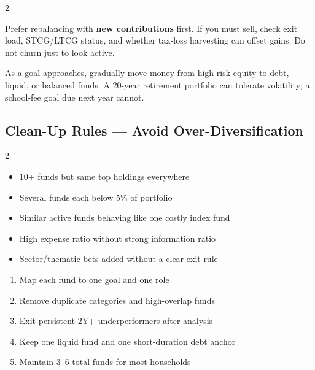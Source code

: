 \documentclass[11pt,a4paper]{article}
\begin{document}
\begin{multicols}{2}
\begin{tipbox}[title=Tax-Aware Rebalancing]
Prefer rebalancing with \textbf{new contributions} first.  If you must sell, check exit load, STCG/LTCG status, and whether tax-loss harvesting can offset gains.  Do not churn just to look active.
\end{tipbox}

\begin{warnbox}[title=Glide Path Near a Goal]
As a goal approaches, gradually move money from high-risk equity to debt, liquid, or balanced funds.  A 20-year retirement portfolio can tolerate volatility; a school-fee goal due next year cannot.
\end{warnbox}
\end{multicols}

\subsection{Clean-Up Rules --- Avoid Over-Diversification}

\begin{multicols}{2}
\begin{warnbox}[title=Symptoms of Too Many Funds]
\begin{itemize}
  \item 10+ funds but same top holdings everywhere
  \item Several funds each below 5\% of portfolio
  \item Similar active funds behaving like one costly index fund
  \item High expense ratio without strong information ratio
  \item Sector/thematic bets added without a clear exit rule
\end{itemize}
\end{warnbox}

\begin{tipbox}[title=Consolidation Method]
\begin{enumerate}
  \item Map each fund to one goal and one role
  \item Remove duplicate categories and high-overlap funds
  \item Exit persistent 2Y+ underperformers after analysis
  \item Keep one liquid fund and one short-duration debt anchor
  \item Maintain 3--6 total funds for most households
\end{enumerate}
\end{tipbox}
\end{multicols}
\end{document}
